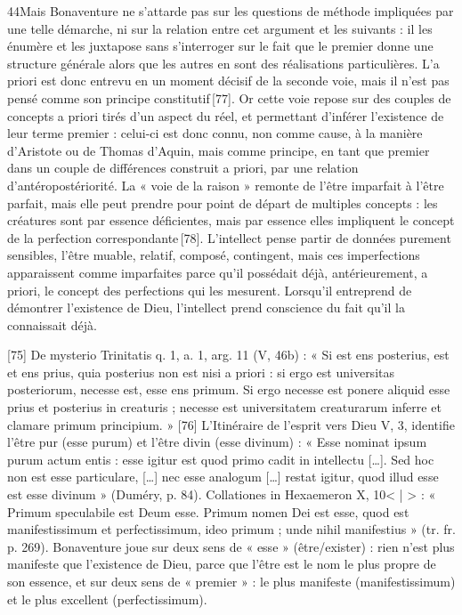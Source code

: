 44Mais Bonaventure ne s’attarde pas sur les questions de méthode impliquées par une telle démarche, ni sur la relation entre cet argument et les suivants : il les énumère et les juxtapose sans s’interroger sur le fait que le premier donne une structure générale alors que les autres en sont des réalisations particulières. L’a priori est donc entrevu en un moment décisif de la seconde voie, mais il n’est pas pensé comme son principe constitutif [77]. Or cette voie repose sur des couples de concepts a priori tirés d’un aspect du réel, et permettant d’inférer l’existence de leur terme premier : celui-ci est donc connu, non comme cause, à la manière d’Aristote ou de Thomas d’Aquin, mais comme principe, en tant que premier dans un couple de différences construit a priori, par une relation d’antéropostériorité. La « voie de la raison » remonte de l’être imparfait à l’être parfait, mais elle peut prendre pour point de départ de multiples concepts : les créatures sont par essence déficientes, mais par essence elles impliquent le concept de la perfection correspondante [78]. L’intellect pense partir de données purement sensibles, l’être muable, relatif, composé, contingent, mais ces imperfections apparaissent comme imparfaites parce qu’il possédait déjà, antérieurement, a priori, le concept des perfections qui les mesurent. Lorsqu’il entreprend de démontrer l’existence de Dieu, l’intellect prend conscience du fait qu’il la connaissait déjà.

 

[75]
De mysterio Trinitatis q. 1, a. 1, arg. 11 (V, 46b) : « Si est ens posterius, est et ens prius, quia posterius non est nisi a priori : si ergo est universitas posteriorum, necesse est, esse ens primum. Si ergo necesse est ponere aliquid esse prius et posterius in creaturis ; necesse est universitatem creaturarum inferre et clamare primum principium. »
[76]
L’Itinéraire de l’esprit vers Dieu V, 3, identifie l’être pur (esse purum) et l’être divin (esse divinum) : « Esse nominat ipsum purum actum entis : esse igitur est quod primo cadit in intellectu […]. Sed hoc non est esse particulare, […] nec esse analogum […] restat igitur, quod illud esse est esse divinum » (Duméry, p. 84). Collationes in Hexaemeron X, 10< | > : « Primum speculabile est Deum esse. Primum nomen Dei est esse, quod est manifestissimum et perfectissimum, ideo primum ; unde nihil manifestius » (tr. fr. p. 269). Bonaventure joue sur deux sens de « esse » (être/exister) : rien n’est plus manifeste que l’existence de Dieu, parce que l’être est le nom le plus propre de son essence, et sur deux sens de « premier » : le plus manifeste (manifestissimum) et le plus excellent (perfectissimum).



